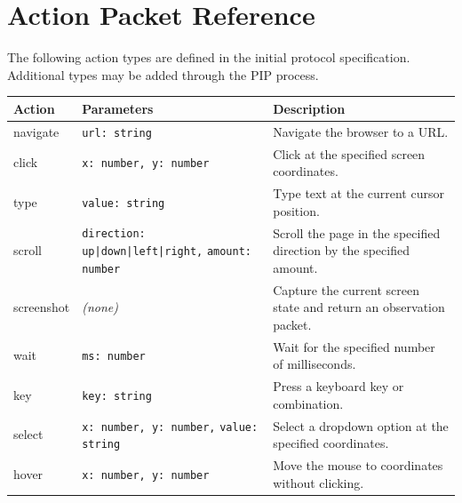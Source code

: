 \documentclass[10pt,twocolumn]{article}
\begin{document}
\section{Action Packet Reference}
\label{app:actionpacket}

The following action types are defined in the initial protocol specification. Additional types may be added through the PIP process.

\begin{longtable}{>{\ttfamily\small}p{2.0cm} p{4.5cm} p{6.5cm}}
\toprule
Action & Parameters & Description \\
\midrule
\endhead
navigate & \texttt{url: string} & Navigate the browser to a URL. \\[3pt]
click & \texttt{x: number, y: number} & Click at the specified screen coordinates. \\[3pt]
type & \texttt{value: string} & Type text at the current cursor position. \\[3pt]
scroll & \texttt{direction: up|down|left|right,} \newline \texttt{amount: number} & Scroll the page in the specified direction by the specified amount. \\[3pt]
screenshot & \textit{(none)} & Capture the current screen state and return an observation packet. \\[3pt]
wait & \texttt{ms: number} & Wait for the specified number of milliseconds. \\[3pt]
key & \texttt{key: string} & Press a keyboard key or combination. \\[3pt]
select & \texttt{x: number, y: number,} \newline \texttt{value: string} & Select a dropdown option at the specified coordinates. \\[3pt]
hover & \texttt{x: number, y: number} & Move the mouse to coordinates without clicking. \\
\bottomrule
\end{longtable}
\end{document}
